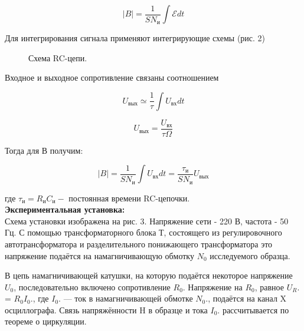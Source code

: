 \documentclass[a4paper, 12pt]{article}%
\begin{document}
	\begin{equation}
	|B|=\dfrac{1}{SN_{и}}\int{\mathcal{E}}dt
	\end{equation}
	
	Для интегрирования сигнала применяют интегрирующие схемы (рис. 2)
	
	\begin{figure}[h]
		\caption{Схема RC-цепи.}
	\end{figure}
	
	Входное и выходное сопротивление связаны соотношением
	
	\begin{equation}
		U_{\text{вых}}\simeq\dfrac{1}{\tau}\int U_{\text{вх}}dt
	\end{equation}
	
	\begin{equation}
		U_{\text{вых}}=\dfrac{U_{\text{вх}}}{\tau\Omega}
	\end{equation}
	
	Тогда для В получим:
	
	\begin{equation}
		|B|=\dfrac{1}{SN_{\text{и}}}\int U_{\text{вх}}dt=\dfrac{\tau_{\text{и}}}{SN_{\text{и}}}U_{\text{вых}}
	\end{equation}
	
	где $\tau_{\text{и}} = R_{\text{и}} C_{\text{и}} -$ постоянная времени RC-цепочки.\\
	
	
	\textbf{Экспериментальная установка: }\\
	
	Схема установки изображена на рис. 3. Напряжение сети - 220 В, частота - 
	50 Гц. С помощью трансформаторного блока Т, состоящего из регулировочного автотрансформатора и разделительного понижающего трансформатора это напряжение подаётся на намагничивающую обмотку $N_0$ исследуемого
	образца.
	
	В цепь намагничивающей катушки, на которую подаётся некоторое
	напряжение $U_0$, последовательно включено сопротивление $R_0$. Напряжение на $R_0$, равное $U_R$. = $R_0 I_0$., где $I_0$. — ток в намагничивающей обмотке $N_0$., подаётся на канал X осциллографа. Связь напряжённости H в образце и тока $I_0$. рассчитывается по теореме о циркуляции.
	
\end{document}
